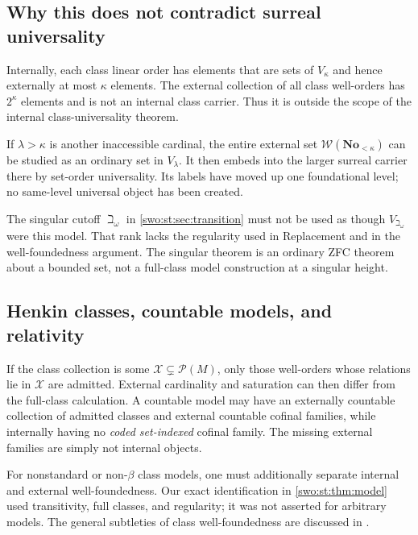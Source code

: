 \documentclass[11pt]{article}
\theoremstyle{definition}
\theoremstyle{remark}
\newcommand{\No}{\mathbf{No}}
\newcommand{\WO}{\mathcal W}
\begin{document}
\subsection{Why this does not contradict surreal universality}

Internally, each class linear order has elements that are sets of
$V_\kappa$ and hence externally at most $\kappa$ elements.
The external collection of all class well-orders has $2^\kappa$
elements and is not an internal class carrier. Thus it is outside the
scope of the internal class-universality theorem.

If $\lambda>\kappa$ is another inaccessible cardinal, the entire
external set $\WO(\No_{<\kappa})$ can be studied as an ordinary set in
$V_\lambda$. It then embeds into the larger surreal carrier there by
set-order universality. Its labels have moved up one foundational level;
no same-level universal object has been created.

The singular cutoff $\beth_\omega$ in \cref{swo:st:sec:transition} must not be
used as though $V_{\beth_\omega}$ were this model. That rank lacks the
regularity used in Replacement and in the well-foundedness argument.
The singular theorem is an ordinary ZFC theorem about a bounded set,
not a full-class model construction at a singular height.

\subsection{Henkin classes, countable models, and relativity}

If the class collection is some $\mathcal X\subsetneq\mathcal P(M)$,
only those well-orders whose relations lie in $\mathcal X$ are admitted.
External cardinality and saturation can then differ from the full-class
calculation. A countable model may have an externally countable collection
of admitted classes and external countable cofinal families, while
internally having no \emph{coded set-indexed} cofinal family. The missing
external families are simply not internal objects.

For nonstandard or non-$\beta$ class models, one must additionally
separate internal and external well-foundedness. Our exact identification
in \cref{swo:st:thm:model} used transitivity, full classes, and regularity; it
was not asserted for arbitrary models. The general subtleties of class
well-foundedness are discussed in \cite[\S3]{HamkinsWoodin}.

\end{document}
